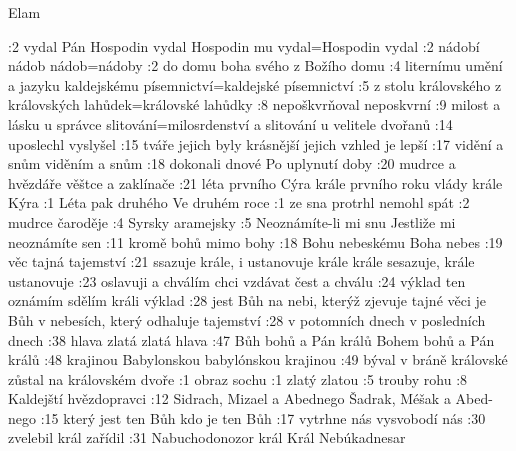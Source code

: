   {} {} {Elam}  {} {} %

:2  {vydal Pán} {} {Hospodin vydal} {Hospodin mu vydal}={Hospodin vydal} {} {}
:2  {nádobí} {} {nádob} {nádob}={nádoby} {} {}
:2  {do domu boha svého} {} {} {z Božího domu} {} {}
:4  {liternímu umění a jazyku} {} {} {kaldejskému písemnictví}={kaldejské písemnictví} {} {}
:5  {z stolu královského} {} {} {z královských lahůdek}={královské lahůdky} {} {}
:8  {nepoškvrňoval} {} {} {neposkvrní} {} {}
:9  {milost a lásku u správce} {} {} {slitování}={milosrdenství a slitování u velitele dvořanů} {} {}
:14 {uposlechl} {} {} {vyslyšel} {} {}
:15 {tváře jejich byly krásnější} {} {} {jejich vzhled je lepší} {} {}
:17 {vidění a snům} {} {} {viděním a snům} {} {}
:18 {dokonali dnové} {} {} {Po uplynutí doby} {} {}
:20 {mudrce a hvězdáře} {} {} {věštce a zaklínače} {} {}
:21 {léta prvního Cýra krále} {} {} {prvního roku vlády krále Kýra} {} {}
:1  {Léta pak druhého} {} {} {Ve druhém roce} {} {}
:1  {ze sna protrhl} {} {} {nemohl spát} {} {}
:2  {mudrce} {} {} {čaroděje} {} {}
:4  {Syrsky} {} {} {aramejsky} {} {}
:5  {Neoznámíte-li mi snu} {} {} {Jestliže mi neoznámíte sen} {} {}
:11 {kromě bohů} {} {} {mimo bohy} {} {}
:18 {Bohu nebeskému} {} {} {Boha nebes} {} {}
:19 {věc tajná} {} {} {tajemství} {} {}
:21 {ssazuje krále, i ustanovuje krále} {} {} {krále sesazuje, krále ustanovuje} {} {}
:23 {oslavuji a chválím} {} {} {chci vzdávat čest a chválu} {} {}
:24 {výklad ten oznámím} {} {} {sdělím králi výklad} {} {}
:28 {jest Bůh na nebi, kterýž zjevuje tajné věci} {} {} {je Bůh v nebesích, který odhaluje tajemství} {} {}
:28 {v potomních dnech} {} {} {v posledních dnech} {} {}
:38 {hlava zlatá} {} {} {zlatá hlava} {} {}
:47 {Bůh bohů a Pán králů} {} {} {Bohem bohů a Pán králů} {} {}
:48 {krajinou Babylonskou} {} {} {babylónskou krajinou} {} {}
:49 {býval v bráně královské} {} {} {zůstal na královském dvoře} {} {}
:1  {obraz} {} {} {sochu} {} {}
:1  {zlatý} {} {} {zlatou} {} {}
:5  {trouby} {} {} {rohu} {} {}
:8  {Kaldejští} {} {} {hvězdopravci} {} {}
:12 {Sidrach, Mizael a Abednego} {} {} {Šadrak, Méšak a Abed-nego} {} {}
:15 {který jest ten Bůh} {} {} {kdo je ten Bůh} {} {}
:17 {vytrhne nás} {} {} {vysvobodí nás} {} {}
:30 {zvelebil} {} {} {král zařídil} {} {}
:31 {Nabuchodonozor král} {} {} {Král Nebúkadnesar} {} {}

